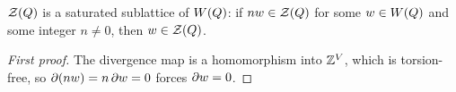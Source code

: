 \begin{proposition}[Saturation]\label{sh-0007}
$\mathcal{Z}(Q)$ is a saturated sublattice of $W(Q)$: if $n w \in \mathcal{Z}(Q)$ for some $w \in W(Q)$ and some integer $n \neq 0$, then $w \in \mathcal{Z}(Q)$.
\end{proposition}
\begin{proof}[First proof]
The divergence map is a homomorphism into $\mathbb{Z}^{V}$, which is torsion-free, so $\partial(n w) = n \, \partial w = 0$ forces $\partial w = 0$.
\end{proof}
